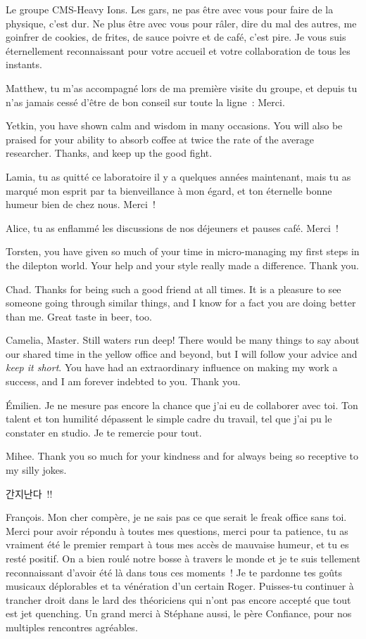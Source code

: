 Le groupe CMS-Heavy Ions. Les gars, ne pas être avec vous pour faire
de la physique, c'est dur. Ne plus être avec vous pour râler, dire du
mal des autres, me goinfrer de cookies, de frites, de sauce poivre et
de café, c'est pire. Je vous suis éternellement reconnaissant pour
votre accueil et votre collaboration de tous les instants.


 Matthew,
tu m'as accompagné lors de ma première visite du groupe, et depuis tu
n'as jamais cessé d'être de bon conseil sur toute la ligne~:
Merci.


 Yetkin, you have shown calm and wisdom in many occasions. You will
 also be praised for your ability to absorb coffee at twice the rate of the average 
researcher. Thanks, and keep up the good fight. 


Lamia, tu as quitté ce laboratoire il y a quelques années maintenant, mais tu as
marqué mon esprit par ta bienveillance à mon égard, et ton éternelle
bonne humeur bien de chez nous. Merci~!


Alice, tu as enflammé les discussions de nos déjeuners et pauses
café. Merci~!


Torsten, you have given so much of your time in micro-managing my first steps in the
dilepton world. Your help and your style really made a
difference. Thank you. 


Chad. Thanks for being such a good friend at all times. It is a
pleasure to see someone going through similar things, and I know for a
fact you are doing better than me. Great taste in beer, too.


Camelia, Master. Still waters run deep! There would be many things to say
about our shared time in the yellow office and beyond, but I will follow
your advice and \textit{keep it short}. You have had an extraordinary
influence on making my work a success, and I am forever indebted to
you. Thank you.


Émilien. Je ne mesure pas encore la chance que j'ai eu de collaborer
avec toi. Ton talent et ton humilité dépassent le simple cadre du
travail, tel que j'ai pu le constater en studio. Je te remercie pour
tout.


Mihee. Thank you so much for
your kindness and for always being so receptive to my silly jokes. \begin{CJK}{UTF8}{mj}간지난다~!!\end{CJK} 


François. Mon cher compère, je ne sais pas ce que serait le freak
office sans toi. Merci pour avoir répondu à toutes mes questions,
merci pour ta patience, tu as vraiment été le premier rempart à tous mes
accès de mauvaise humeur, et tu es resté positif. On a bien roulé
notre bosse à travers le monde et je te suis tellement reconnaissant
d'avoir été là dans tous ces moments~! Je te pardonne tes goûts
musicaux déplorables et ta vénération d'un certain Roger. Puisses-tu
continuer à trancher droit dans le lard des théoriciens qui n'ont pas
encore accepté que tout est jet quenching. Un grand merci
à Stéphane aussi, le père Confiance, pour nos multiples rencontres agréables.  


